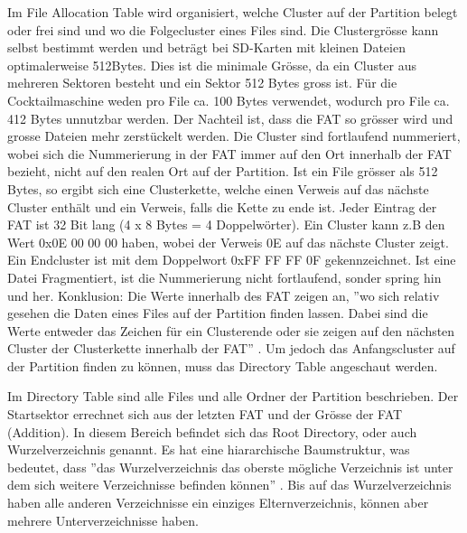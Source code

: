 Im File Allocation Table wird organisiert, welche Cluster auf der Partition belegt oder frei sind und wo die Folgecluster eines Files sind. Die Clustergrösse kann selbst bestimmt werden und beträgt bei SD-Karten mit kleinen Dateien optimalerweise 512Bytes. Dies ist die minimale Grösse, da ein Cluster aus mehreren Sektoren besteht und ein Sektor 512 Bytes gross ist. Für die Cocktailmaschine weden pro File ca. 100 Bytes verwendet, wodurch pro File ca. 412 Bytes unnutzbar werden. Der Nachteil ist, dass die FAT so grösser wird und grosse Dateien mehr zerstückelt werden. Die Cluster sind fortlaufend nummeriert, wobei sich die Nummerierung in der FAT immer auf den Ort innerhalb der FAT bezieht, nicht auf den realen Ort auf der Partition. Ist ein File grösser als 512 Bytes, so ergibt sich eine Clusterkette, welche einen Verweis auf das nächste Cluster enthält und ein Verweis, falls die Kette zu ende ist. Jeder Eintrag der FAT ist 32 Bit lang (4 x 8 Bytes = 4 Doppelwörter). Ein Cluster kann z.B den Wert 0x0E 00 00 00 haben, wobei der Verweis 0E auf das nächste Cluster zeigt. Ein Endcluster ist mit dem Doppelwort 0xFF FF FF 0F gekennzeichnet. Ist eine Datei Fragmentiert, ist die Nummerierung nicht fortlaufend, sonder spring hin und her. Konklusion: Die Werte innerhalb des FAT zeigen an, ''wo sich relativ gesehen die Daten eines Files auf der Partition finden lassen. Dabei sind die Werte entweder das Zeichen für ein Clusterende oder sie zeigen auf den nächsten Cluster der Clusterkette innerhalb der FAT'' . Um jedoch das Anfangscluster auf der Partition finden zu können, muss das Directory Table angeschaut werden.

Im Directory Table sind alle Files und alle Ordner der Partition beschrieben. Der Startsektor errechnet sich aus der letzten FAT und der Grösse der FAT (Addition). In diesem Bereich befindet sich das Root Directory, oder auch Wurzelverzeichnis genannt. Es hat eine hiararchische Baumstruktur, was bedeutet, dass ''das Wurzelverzeichnis das oberste mögliche Verzeichnis ist unter dem sich weitere Verzeichnisse befinden können'' . Bis auf das Wurzelverzeichnis haben alle anderen Verzeichnisse ein einziges Elternverzeichnis, können aber mehrere Unterverzeichnisse haben.

